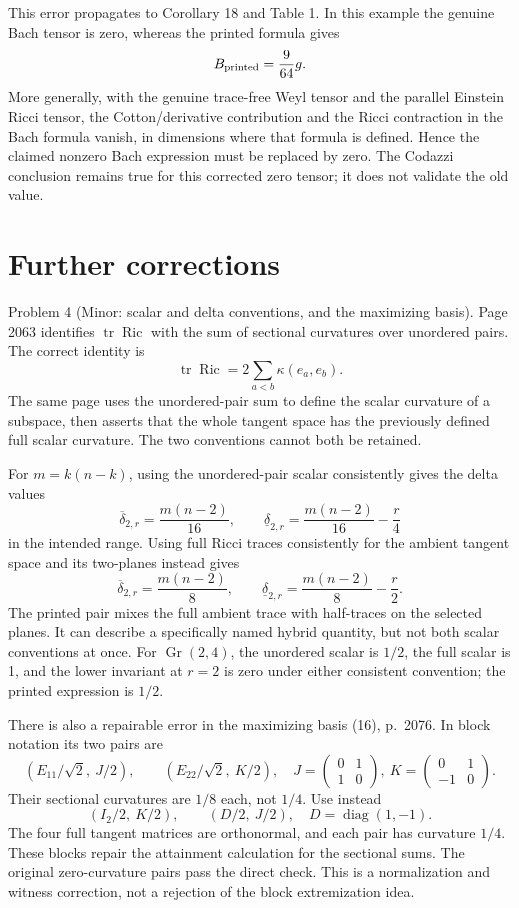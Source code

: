 \documentclass[10pt]{article}
\begin{document}
This error propagates to Corollary 18 and Table 1. In this example the genuine Bach tensor is zero, whereas the printed formula gives \[B_{\rm printed}=\frac9{64}g.\] More generally, with the genuine trace-free Weyl tensor and the parallel Einstein Ricci tensor, the Cotton/derivative contribution and the Ricci contraction in the Bach formula vanish, in dimensions where that formula is defined. Hence the claimed nonzero Bach expression must be replaced by zero. The Codazzi conclusion remains true for this corrected zero tensor; it does not validate the old value.\par
\section*{Further corrections}
Problem 4 (Minor: scalar and delta conventions, and the maximizing basis).  Page 2063 identifies \(\mathop{\mathrm{tr}}\mathop{\mathrm{Ric}}\) with the sum of sectional curvatures over unordered pairs. The correct identity is \[\mathop{\mathrm{tr}}\mathop{\mathrm{Ric}}=2\sum_{a<b}\kappa(e_a,e_b).\] The same page uses the unordered-pair sum to define the scalar curvature of a subspace, then asserts that the whole tangent space has the previously defined full scalar curvature. The two conventions cannot both be retained.\par
For \(m=k(n-k)\), using the unordered-pair scalar consistently gives the delta values \[\overline\delta_{2,r}=\frac{m(n-2)}{16},\qquad
 \underline\delta_{2,r}=\frac{m(n-2)}{16}-\frac r4\] in the intended range. Using full Ricci traces consistently for the ambient tangent space and its two-planes instead gives \[\overline\delta_{2,r}=\frac{m(n-2)}8,\qquad
 \underline\delta_{2,r}=\frac{m(n-2)}8-\frac r2.\] The printed pair mixes the full ambient trace with half-traces on the selected planes. It can describe a specifically named hybrid quantity, but not both scalar conventions at once. For \(\mathop{\mathrm{Gr}}(2,4)\), the unordered scalar is \(1/2\), the full scalar is 1, and the lower invariant at \(r=2\) is zero under either consistent convention; the printed expression is \(1/2\).\par
There is also a repairable error in the maximizing basis (16), p. 2076. In block notation its two pairs are \[(E_{11}/\sqrt2,\ J/2),\qquad(E_{22}/\sqrt2,\ K/2),
 \quad
 J=\begin{pmatrix}0&1\\1&0\end{pmatrix},\
 K=\begin{pmatrix}0&1\\-1&0\end{pmatrix}.\] Their sectional curvatures are \(1/8\) each, not \(1/4\). Use instead \[(I_2/2,\ K/2),\qquad(D/2,\ J/2),
 \quad D=\operatorname{diag}(1,-1).\] The four full tangent matrices are orthonormal, and each pair has curvature \(1/4\). These blocks repair the attainment calculation for the sectional sums. The original zero-curvature pairs pass the direct check. This is a normalization and witness correction, not a rejection of the block extremization idea.\par
\end{document}

